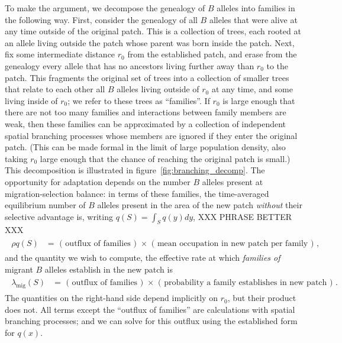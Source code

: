 \documentclass{article}
\newcommand{\migrate}{\lambda_\text{mig}}
\begin{document}
To make the argument, we decompose the genealogy of $B$ alleles into families in the following way.
First, consider the genealogy of all $B$ alleles that were alive at any time outside of the original patch.  
This is a collection of trees, each rooted at an allele living outside the patch whose parent was born inside the patch.
Next, fix some intermediate distance $r_0$ from the established patch,
and erase from the genealogy every allele that has no ancestors living further away than $r_0$ to the patch.
This fragments the original set of trees into a collection of smaller trees that relate to each other all $B$ alleles living outside of $r_0$ at any time,
and some living inside of $r_0$;
we refer to these trees as ``families''.
If $r_0$ is large enough that there are not too many families
and interactions between family members are weak,
then these families can be approximated 
by a collection of independent spatial branching processes
whose members are ignored if they enter the original patch.
(This can be made formal in the limit of large population density, also taking $r_0$ large enough that the chance of reaching the original patch is small.)
This decomposition is illustrated in figure~\ref{fig:branching_decomp}.
The opportunity for adaptation depends on the number $B$ alleles present at migration-selection balance:
in terms of these families, the time-averaged equilibrium number of $B$ alleles
present in the area of the new patch \emph{without} their selective advantage is,
writing $q(S) = \int_S q(y) dy$,
XXX PHRASE BETTER XXX
\begin{align}
    \label{eqn:gestalt_q}
    \begin{split}
        \rho q(S) &= \text{ ( outflux of families ) } \times \text{ ( mean occupation in new patch per family ) } ,
\end{split}
\end{align}
and the quantity we wish to compute,
the effective rate at which \emph{families of} migrant $B$ alleles establish in the new patch
is
\begin{align}
    \label{eqn:gestalt_migrate}
    \begin{split}
        \migrate(S) &= \text{ ( outflux of families ) } \times \text{ ( probability a family establishes in new patch ) } .
    \end{split}
\end{align}
The quantities on the right-hand side depend implicitly on $r_0$,
but their product does not.
All terms except the ``outflux of families'' are calculations with spatial branching processes;
and we can solve for this outflux using the established form for $q(x)$.
\end{document}
